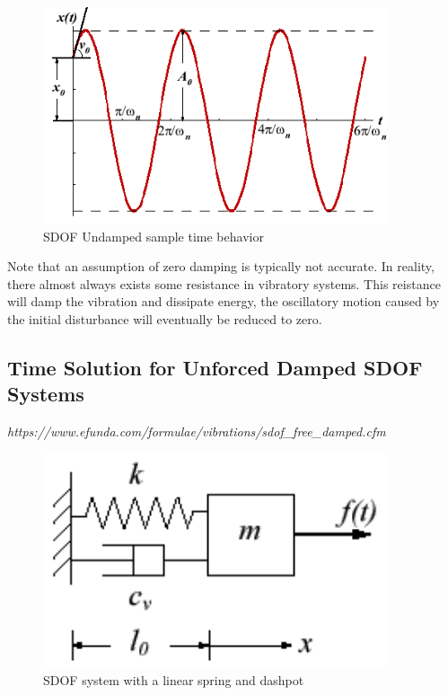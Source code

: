 \documentclass[10pt,b5paper,titlepage]{book}
\begin{document}
\begin{figure}[ht]
    \centering
    \includegraphics[width=0.90\textwidth]{img/SDOF_Undamped_Response.png}
    \caption{SDOF Undamped sample time behavior}
    \label{fig:SDOF-undamped-response-png}
\end{figure}

Note that an assumption of zero damping is typically not accurate. In reality,
there almost always exists some resistance in vibratory systems. This reistance
will damp the vibration and dissipate energy, the oscillatory motion caused by the
initial disturbance will eventually be reduced to zero.


\subsection{Time Solution for Unforced Damped SDOF Systems}

\textit{https://www.efunda.com/formulae/vibrations/sdof\_free\_damped.cfm}

\begin{figure}[ht]
    \centering
    \includegraphics[width=0.90\textwidth]{img/SDOF_plot.png}
    \caption{SDOF system with a linear spring and dashpot}
    \label{fig:SDOF-plot-damped-png}
\end{figure}
\end{document}
